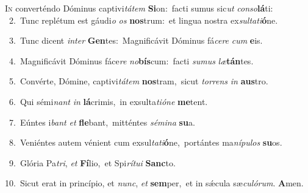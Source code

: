 \lettrine{\initial\textcolor{\initialcolor}{I}}{n} converténdo Dóminus captivi\-\textit{tá}\-\textit{tem} \textbf{Si}\-on:~\star facti sumus sic\textit{ut} \textit{con}\-\textit{so}\textbf{lá}ti:\\
{\numbfont\textcolor{\numbcolor}{~2.}}~Tunc replétum est gáudi\textit{o} \textit{os} \textbf{nos}\-trum:~\star et lingua nostra ex\-\textit{sul}\-\textit{ta}\textit{ti}\textbf{ó}ne.\par
{\numbfont\textcolor{\numbcolor}{~3.}}~Tunc dicent \textit{in}\-\textit{ter} \textbf{Gen}\-tes:~\star Magnificávit Dóminus fá\-\textit{ce}\-\textit{re} \textit{cum} \textbf{e}\-is.\par
{\numbfont\textcolor{\numbcolor}{~4.}}~Magnificávit Dóminus fáce\textit{re} \textit{no}\-\textbf{bís}cum:~\star facti \textit{su}\-\textit{mus} \textit{læ}\-\textbf{tán}tes.\par
{\numbfont\textcolor{\numbcolor}{~5.}}~Convérte, Dómine, captivi\-\textit{tá}\-\textit{tem} \textbf{nos}\-tram,~\star sicut \textit{tor}\-\textit{rens} \textit{in} \textbf{aus}\-tro.\par
{\numbfont\textcolor{\numbcolor}{~6.}}~Qui sémi\textit{nant} \textit{in} \textbf{lá}\-crimis,~\star in exsulta\-\textit{ti}\-\textit{ó}\textit{ne} \textbf{me}\-tent.\par
{\numbfont\textcolor{\numbcolor}{~7.}}~Eúntes i\textit{bant} \textit{et} \textbf{fle}\-bant,~\star mitténtes \textit{sé}\-\textit{mi}\textit{na} \textbf{su}\-a.\par
{\numbfont\textcolor{\numbcolor}{~8.}}~Veniéntes autem vénient cum exsul\-\textit{ta}\-\textit{ti}\textbf{ó}ne,~\star portántes ma\-\textit{ní}\-\textit{pu}\textit{los} \textbf{su}\-os.\par
{\numbfont\textcolor{\numbcolor}{~9.}}~Glória Pa\-\textit{tri}\-, \textit{et} \textbf{Fí}\-lio,~\star et Spi\-\textit{rí}\-\textit{tu}\textit{i} \textbf{Sanc}\-to.\par
{\numbfont\textcolor{\numbcolor}{10.}}~Sicut erat in princípio, et \textit{nunc}\-, \textit{et} \textbf{sem}\-per,~\star et in sǽcula sæ\-\textit{cu}\-\textit{ló}\textit{rum}. \textbf{A}\-men.\par
